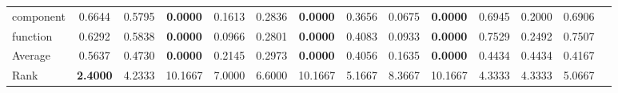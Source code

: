 \begin{threeparttable}
\begin{tabular}{lccccccccccccc}
component &0.6644 &0.5795 &\textbf{0.0000} &0.1613 &0.2836 &\textbf{0.0000} &0.3656 &0.0675 &\textbf{0.0000} &0.6945 &0.2000 &0.6906 &  \\
function &0.6292 &0.5838 &\textbf{0.0000} &0.0966 &0.2801 &\textbf{0.0000} &0.4083 &0.0933 &\textbf{0.0000} &0.7529 &0.2492 &0.7507 &  \\
\hline
Average &0.5637 &0.4730 &\textbf{0.0000} &0.2145 &0.2973 &\textbf{0.0000} &0.4056 &0.1635 &\textbf{0.0000} &0.4434 &0.4434 &0.4167 &  \\
Rank &\textbf{2.4000} &4.2333 &10.1667 &7.0000 &6.6000 &10.1667 &5.1667 &8.3667 &10.1667 &4.3333 &4.3333 &5.0667 &  \\
\bottomrule
\end{tabular}
\end{threeparttable}